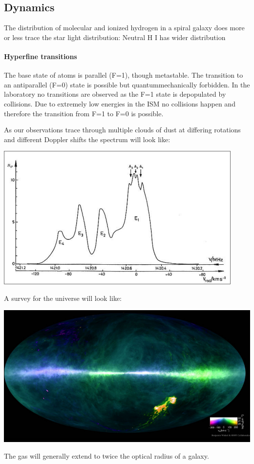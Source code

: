 \documentclass[11pt,a4paper]{article}
\begin{document}
\subsection{Dynamics}
The distribution of molecular and ionized hydrogen in a spiral galaxy
does more or less trace the star light distribution: Neutral H I has wider
distribution

 \paragraph{Hyperfine transitions}
 The base state of atoms is parallel (F=1), though metastable. 
 The transition to an antiparallel (F=0) state is possible but quantummechanically forbidden. 
 In the laboratory no transitions are observed as the F=1 state is depopulated by collisions. 
 Due to extremely low energies in the ISM no collisions happen and therefore the transition from F=1 to F=0 is possible.

 As our observations trace through multiple clouds of dust at differing rotations and different Doppler shifts the spectrum will look like: 
\begin{center}
    \includegraphics[width=0.8\linewidth]{screenshot_2024-01-26-124045.png}
\end{center}
A survey for the universe will look like:
\begin{center}
    \includegraphics[width=0.8\linewidth]{screenshot_2024-01-26-124214.png}
\end{center}
The gas will generally extend to twice the optical radius of a galaxy.
\end{document}
